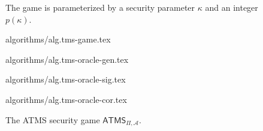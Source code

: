 \begin{figure}
  \begin{algorithm}[H]
    The game is parameterized by a security parameter $\kappa$ and an
    integer $p(\kappa)$.
    \caption{\label{alg.tms-game}The game $\textsf{ATMS}_{\Pi,\mathcal{A}}$}
    \begin{algorithmic}[1]
      {algorithms/alg.tms-game.tex}
    \end{algorithmic}
  \end{algorithm}
  \vskip -15mm
  \begin{minipage}[t]{0.3\textwidth}
    \begin{algorithm}[H]
      \caption{\label{alg.tms-oracle-gen} The oracle $\mathcal{O}^\textsf{gen}$}
      \begin{algorithmic}[1]
        {algorithms/alg.tms-oracle-gen.tex}
      \end{algorithmic}
    \end{algorithm}
  \end{minipage}
  \textwidth
  \begin{minipage}[t]{0.3\textwidth}
    \begin{algorithm}[H]
      \caption{\label{alg.tms-oracle-sig} The oracle $\mathcal{O}^\textsf{sig}$}
      \begin{algorithmic}[1]
        {algorithms/alg.tms-oracle-sig.tex}
      \end{algorithmic}
    \end{algorithm}
  \end{minipage}
  \textwidth
  \begin{minipage}[t]{0.3\textwidth}
    \begin{algorithm}[H]
      \caption{\label{alg.tms-oracle-cor} The oracle $\mathcal{O}^\textsf{cor}$}
      \begin{algorithmic}[1]
        {algorithms/alg.tms-oracle-cor.tex}
      \end{algorithmic}
    \end{algorithm}
  \end{minipage}
  \caption{The ATMS security game $\textsf{ATMS}_{\Pi,\mathcal{A}}$.}
  \label{fig:ATMS-game}
\end{figure}
